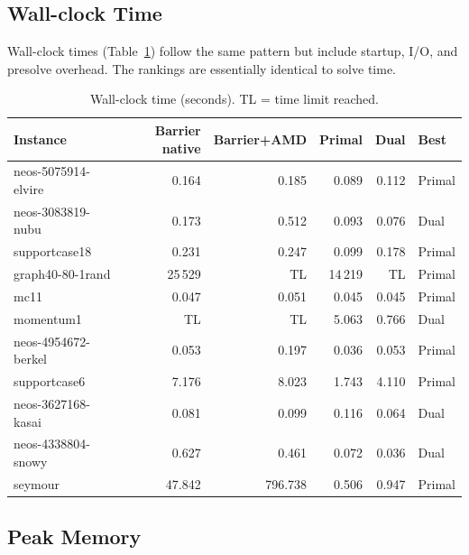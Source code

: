 \documentclass[11pt,a4paper]{article}
\begin{document}
\subsection{Wall-clock Time}
\label{sec:walltime}

Wall-clock times (Table~\ref{tab:walltime}) follow the same pattern but
include startup, I/O, and presolve overhead.  The rankings are essentially
identical to solve time.

\begin{table}[h]
\centering
\caption{Wall-clock time (seconds). TL = time limit reached.}
\label{tab:walltime}
\setlength{\tabcolsep}{5pt}
\begin{tabular}{@{}lrrrrl@{}}
\toprule
\textbf{Instance}
  & \textbf{Barrier native}
  & \textbf{Barrier+AMD}
  & \textbf{Primal}
  & \textbf{Dual}
  & \textbf{Best} \\
\midrule
neos-5075914-elvire  & 0.164 & 0.185 & \cellcolor{bestcell}0.089 & 0.112 & Primal \\
neos-3083819-nubu    & 0.173 & 0.512 & 0.093 & \cellcolor{bestcell}0.076 & Dual \\
supportcase18        & 0.231 & 0.247 & \cellcolor{bestcell}0.099 & 0.178 & Primal \\
graph40-80-1rand     & 25\,529 & \cellcolor{tlcell}TL & \cellcolor{bestcell}14\,219 & \cellcolor{tlcell}TL & Primal \\
mc11                 & 0.047 & 0.051 & \cellcolor{bestcell}0.045 & 0.045 & Primal \\
momentum1            & \cellcolor{tlcell}TL & \cellcolor{tlcell}TL & 5.063 & \cellcolor{bestcell}0.766 & Dual \\
neos-4954672-berkel  & 0.053 & 0.197 & \cellcolor{bestcell}0.036 & 0.053 & Primal \\
supportcase6         & 7.176 & 8.023 & \cellcolor{bestcell}1.743 & 4.110 & Primal \\
neos-3627168-kasai   & 0.081 & 0.099 & 0.116 & \cellcolor{bestcell}0.064 & Dual \\
neos-4338804-snowy   & 0.627 & 0.461 & 0.072 & \cellcolor{bestcell}0.036 & Dual \\
seymour              & 47.842 & 796.738 & \cellcolor{bestcell}0.506 & 0.947 & Primal \\
\bottomrule
\end{tabular}
\end{table}

\subsection{Peak Memory}
\label{sec:memory}
\end{document}
